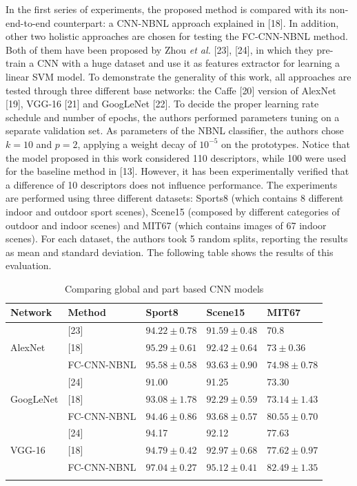 In the first series of experiments, the proposed method is compared with
its non-end-to-end counterpart: a CNN-NBNL approach explained in
{[}18{]}. In addition, other two holistic approaches are chosen for
testing the FC-CNN-NBNL method. Both of them have been proposed by Zhou
\emph{et al.} {[}23{]}, {[}24{]}, in which they pre-train a CNN with a
huge dataset and use it as features extractor for learning a linear SVM
model. To demonstrate the generality of this work, all approaches are
tested through three different base networks: the Caffe {[}20{]} version
of AlexNet {[}19{]}, VGG-16 {[}21{]} and GoogLeNet {[}22{]}. To decide
the proper learning rate schedule and number of epochs, the authors
performed parameters tuning on a separate validation set. As parameters
of the NBNL classifier, the authors chose $k = 10$ and $p = 2$,
applying a weight decay of $10^{-5}$ on the prototypes. Notice that
the model proposed in this work considered 110 descriptors, while 100
were used for the baseline method in {[}13{]}. However, it has been
experimentally verified that a difference of 10 descriptors does not
influence performance. The experiments are performed using three
different datasets: Sports8 (which contains 8 different indoor and
outdoor sport scenes), Scene15 (composed by different categories of
outdoor and indoor scenes) and MIT67 (which contains images of 67 indoor
scenes). For each dataset, the authors took 5 random splits, reporting
the results as mean and standard deviation. The following table shows
the results of this evaluation.

\begin{longtable}[]{@{}lllll@{}}
\toprule
\textbf{Network} & \textbf{Method} & \textbf{Sport8} & \textbf{Scene15}
& \textbf{MIT67}\tabularnewline
\midrule
\endhead
& {[}23{]} & $94.22\pm0.78$ & $91.59\pm0.48$ & 70.8\tabularnewline
AlexNet & {[}18{]} & $95.29 \pm 0.61$ & $92.42 \pm 0.64$ & $73 \pm
0.36$\tabularnewline
& FC-CNN-NBNL & $\boldsymbol{95.58 \pm 0.58}$ & $\boldsymbol{93.63 \pm 0.90}$ &
$\boldsymbol{74.98 \pm 0.78}$\tabularnewline
& {[}24{]} & $91.00$ & 91.25 & 73.30\tabularnewline
GoogLeNet & {[}18{]} & $93.08 \pm 1.78$ & $92.29 \pm 0.59$ & $73.14 \pm
1.43$\tabularnewline
& FC-CNN-NBNL & $\boldsymbol{94.46 \pm 0.86}$ & $\boldsymbol{93.68 \pm 0.57}$ &
$\boldsymbol{80.55 \pm 0.70}$\tabularnewline
& {[}24{]} & 94.17 & 92.12 & 77.63\tabularnewline
VGG-16 & {[}18{]} & $94.79 \pm 0.42$ & $92.97 \pm 0.68$ & $77.62 \pm
0.97$\tabularnewline
& FC-CNN-NBNL & $\boldsymbol{97.04 \pm 0.27}$ & $\boldsymbol{95.12 \pm 0.41}$ &
$\boldsymbol{82.49 \pm 1.35}$\tabularnewline
\bottomrule
\caption{Comparing global and part based CNN models}
\end{longtable}

